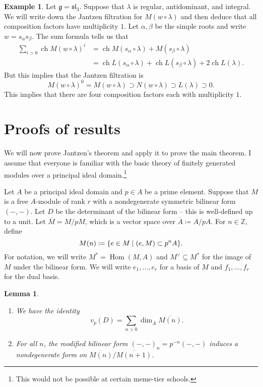 \documentclass[leqno, openany]{memoir}
\newtheorem{lem}[thm]{Lemma}
\theoremstyle{definition}
\newtheorem{exm}[thm]{Example}
\theoremstyle{remark}
\theoremstyle{plain}
\theoremstyle{definition}
\theoremstyle{remark}
\newcommand{\Z}{\mathbb{Z}}
\newcommand{\g}{\mathfrak{g}}
\newcommand{\mf}[1]{\mathfrak{#1}}
\newcommand{\ol}[1]{\overline{#1}}
\DeclareMathOperator{\Hom}{Hom}
\DeclareMathOperator{\ch}{ch}
\begin{document}
\begin{exm}
  Let $\g = \mf{sl}_3$. Suppose that $\lambda$ is regular, antidominant, and integral. We will write down the Jantzen filtration for $M(w \circ \lambda)$ and then deduce that all composition factors have multiplicity $1$. Let $\alpha, \beta$ be the simple roots and write $w = s_{\alpha} s_{\beta}$. The sum formula tells us that
  \begin{align*}
    \sum_{i>0} \ch M(w \circ \lambda)^i &= \ch M(s_{\alpha} \circ \lambda) + M(s_{\beta} \circ \lambda) \\
    &= \ch L(s_{\alpha} \circ \lambda) + \ch L(s_{\beta} \circ \lambda) + 2 \ch L(\lambda).
  \end{align*}
  But this implies that the Jantzen filtration is
  \[ M(w \circ \lambda)^0 = M(w \circ \lambda) \supset N(w \circ \lambda) \supset L(\lambda) \supset 0. \]
  This implies that there are four composition factors each with multiplicity $1$.
\end{exm}

\section{Proofs of results}
\label{sec:proofs_of_results}

We will now prove Jantzen's theorem and apply it to prove the main theorem. I assume that everyone is familiar with the basic theory of finitely generated modules over a principal ideal domain.\footnote{This would not be possible at certain meme-tier schools.}

Let $A$ be a principal ideal domain and $p \in A$ be a prime element. Suppose that $M$ is a free $A$-module of rank $r$ with a nondegenerate symmetric bilinear form $(-,-)$. Let $D$ be the determinant of the bilinear form -- this is well-defined up to a unit. Let $\ol{M} = M/pM$, which is a vector space over $\ol{A} \coloneqq A/pA$. For $n \in \Z$, define
\[ M(n) \coloneqq \qty{e \in M \mid (e, M) \subset p^n A}. \]
For notation, we will write $M^* = \Hom(M, A)$ and $M^{\vee} \subseteq M^*$ for the image of $M$ under the bilinear form. We will write $e_1, \ldots, e_r$ for a basis of $M$ and $f_1, \ldots, f_r$ for the dual basis.
\begin{lem}\leavevmode
  \begin{enumerate}
    \item We have the identity
          \[ v_p(D) = \sum_{n > 0} \dim_{\ol{A}} \ol{M(n)}. \]
    \item For all $n$, the modified bilinear form $(-,-)_n = p^{-n}(-,-)$ induces a nondegenerate form on $\ol{M(n)} / \ol{M(n+1)}$.
  \end{enumerate}
\end{lem}
\end{document}
